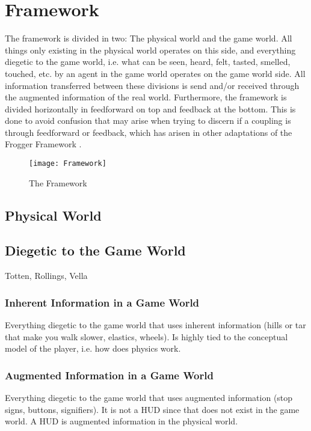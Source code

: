 \section{Framework}

The framework is divided in two: The physical world and the game world. All things only existing in the physical world operates on this side, and everything diegetic to the game world, i.e. what can be seen, heard, felt, tasted, smelled, touched, etc. by an agent in the game world operates on the game world side. All information transferred between these divisions is send and/or received through the augmented information of the real world.
Furthermore, the framework is divided horizontally in feedforward on top and feedback at the bottom. This is done to avoid confusion that may arise when trying to discern if a coupling is through feedforward or feedback, which has arisen in other adaptations of the Frogger Framework \cite{tangifrog}.

\begin{figure}
  \texttt{[image: Framework]}
  \caption{The Framework}
  \label{framework}
\end{figure}

\subsection{Physical World}
\cite{norman} \cite{frogger} \cite{dourish}

\subsection{Diegetic to the Game World}
Totten, Rollings, Vella

\subsubsection{Inherent Information in a Game World}
Everything diegetic to the game world that uses inherent information (hills or tar that make you walk slower, elastics, wheels). Is highly tied to the conceptual model of the player, i.e. how does physics work.

\subsubsection{Augmented Information in a Game World}
Everything diegetic to the game world that uses augmented information (stop signs, buttons, signifiers). It is not a HUD since that does not exist in the game world. A HUD is augmented information in the physical world.

